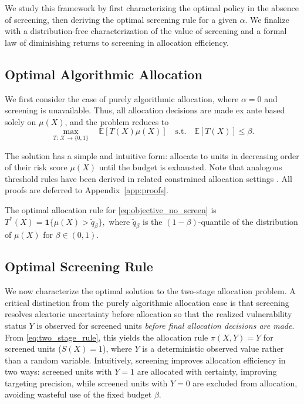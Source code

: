 We study this framework by first characterizing the optimal policy in the absence of screening, then deriving the optimal screening rule for a given $\alpha$. We finalize with a distribution-free characterization of the value of screening and  a formal law of diminishing returns to screening in allocation efficiency.


\subsection{Optimal Algorithmic Allocation}

We first consider the case of purely algorithmic allocation, where $\alpha = 0$ and screening is unavailable. Thus, all allocation decisions are made ex ante based solely on $\mu(X)$, and the problem reduces to
\begin{equation}
\label{eq:objective_no_screen}
\max_{T:~ \mathcal{X} \to \{0,1\}} \quad \mathbb{E}[T(X)\mu(X)] \quad \text{s.t.} \quad \mathbb{E}[T(X)] \leq \beta.
\end{equation}

The solution has a simple and intuitive form: allocate to units in decreasing order of their risk score $\mu(X)$ until the budget is exhausted. Note that analogous threshold rules have been derived in related constrained allocation settings \citep{kitagawa2018should, luedtke2016optimal, fischer2025value}. All proofs are deferred to Appendix~\ref{app:proofs}.

\begin{proposition}
\label{prop:optimal_no_screening}
The optimal allocation rule for \eqref{eq:objective_no_screen} is
$T^*(X) = \mathbf{1}\{\mu(X) > \widetilde{q}_\beta\},$
where $\widetilde{q}_\beta$ is the $(1-\beta)$-quantile of the distribution of $\mu(X)$ for $\beta \in (0,1)$.
\end{proposition}





\subsection{Optimal Screening Rule}

We now characterize the optimal solution to the two-stage allocation problem. A critical distinction from the purely algorithmic allocation case is that screening resolves aleatoric uncertainty before allocation so that the realized vulnerability status $Y$ is observed for screened units \textit{before final allocation decisions are made}. From \eqref{eq:two_stage_rule}, this yields the allocation rule $\pi(X,Y) = Y$ for screened units ($S(X) = 1$), where $Y$ is a deterministic observed value rather than a random variable. Intuitively, screening improves allocation efficiency in two ways: screened units with $Y=1$ are allocated with certainty, improving targeting precision, while screened units with $Y=0$ are excluded from allocation, avoiding wasteful use of the fixed budget $\beta$.

